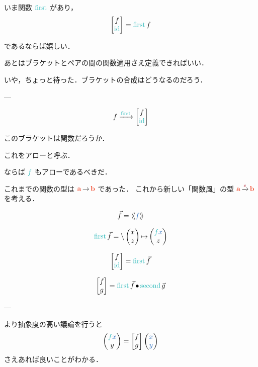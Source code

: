 \documentclass[a5paper,twoside,fleqn,draft]{jsbook}
\def\llangle{\langle\!\langle}
\def\rrangle{\rangle\!\rangle}
\def\varColor{NavyBlue}
\def\funcColor{BlueGreen}
\def\typeColor{RedOrange}
\def\typeConstColor{Maroon}
\newcommand{\Langle}{\llangle}
\newcommand{\Rangle}{\rrangle}
\newcommand{\mTypeConstructor}[1]{\textcolor{\typeConstColor}{\textbf{\textit{#1}}}}
\newcommand{\mVar}[1]{\textcolor{\varColor}{#1}}
\newcommand{\mXVar}{\mVar{x}}
\newcommand{\mYVar}{\mVar{y}}
\newcommand{\mFunc}[1]{\textcolor{\funcColor}{#1}}
\newcommand{\mSpecialFunc}[1]{\textcolor{\funcColor}{\textrm{#1}}}
\newcommand{\mFFunc}{{\mFunc{f}}}
\DeclareMathOperator{\mFirst}{\mSpecialFunc{first}}
\DeclareMathOperator{\mId}{\mSpecialFunc{id}}
\DeclareMathOperator{\mSecond}{\mSpecialFunc{second}}
\newcommand{\mCatArrow}[1]{\xrightarrow{#1}}
\DeclareMathOperator{\mCatArrowC}{\mCatArrow{\mTypeConstructor{c}}}
\DeclareMathOperator{\mCompCat}{\bullet}
\DeclareMathOperator{\mFuncArrow}{\rightarrow}
\DeclareMathOperator{\mLambda}{\backslash}
\DeclareMathOperator{\mLambdaArrow}{\mapsto}
\newcommand{\mType}[1]{\textcolor{\typeColor}{\mathbf{#1}}}
\newcommand{\mA}{\mType{a}}
\newcommand{\mB}{\mType{b}}
\newcommand{\mArrowWith}[1]{\Langle\mVar{#1}\Rangle}
\newcommand{\mPairWith}[2]{\begin{pmatrix}#1\\#2\end{pmatrix}}
\begin{document}
いま関数 $\mFirst$ があり，
\begin{equation}
  \begin{bmatrix}
    f\\
    \mId
  \end{bmatrix}
  =\mFirst f
\end{equation}


であるならば嬉しい．

あとはブラケットとペアの間の関数適用さえ定義できればいい．

いや，ちょっと待った．ブラケットの合成はどうなるのだろう．

---

\begin{equation}
  f
  \xrightarrow{\mFirst}
  \begin{bmatrix}
    f\\
    \mId
  \end{bmatrix}
\end{equation}

このブラケットは関数だろうか．

これをアローと呼ぶ．

ならば $\mFFunc$ もアローであるべきだ．

これまでの関数の型は $\mA\mFuncArrow\mB$ であった．
これから新しい「関数風」の型 $\mA\mCatArrowC\mB$ を考える．

\begin{equation}
  \Vec{f}
  =\mArrowWith{f}
\end{equation}

\begin{equation}
  \mFirst\Vec{f}
  =\mLambda{\mPairWith{x}{z}}\mLambdaArrow\mPairWith{\mFFunc\mXVar}{z}
\end{equation}

\begin{equation}
  \begin{bmatrix}
    f\\
    \mId
  \end{bmatrix}
  =\mFirst\Vec{f}
\end{equation}

\begin{equation}
  \begin{bmatrix}
    f\\g
  \end{bmatrix}
  =\mFirst\Vec{f}\mCompCat\mSecond\Vec{g}
\end{equation}

---

より抽象度の高い議論を行うと
\begin{equation}
  \mPairWith{\mFFunc\mXVar}{y}
  =\begin{bmatrix}f\\g\end{bmatrix}
  \mPairWith{\mXVar}{\mYVar}
\end{equation}
さえあれば良いことがわかる．
\end{document}

